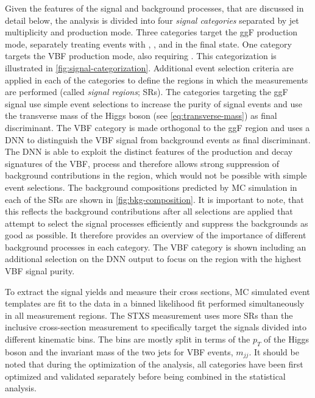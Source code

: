 Given the features of the signal and background processes, that are discussed in detail below, the analysis is divided into four \emph{signal categories} separated by jet multiplicity and production mode.
Three categories target the ggF production mode, separately treating events with \ZeroJet, \OneJet, and \TwoJet in the final state. One category targets the VBF production mode, also requiring \TwoJet. 
This categorization is illustrated in \cref{fig:signal-categorization}.
Additional event selection criteria are applied in each of the categories to define the regions in which the measurements are performed (called \emph{signal regions}; SRs).
The categories targeting the ggF signal use simple event selections to increase the purity of signal events and use the transverse mass of the Higgs boson (see \cref{eq:transverse-mass}) as final discriminant.
The VBF \TwoJet category is made orthogonal to the ggF \TwoJet region and uses a DNN to distinguish the VBF signal from background events as final discriminant.
The DNN is able to exploit the distinct features of the production and decay signatures of the VBF, \HWW process and therefore allows strong suppression of background contributions in the \TwoJet region, which would not be possible with simple event selections. 
The background compositions predicted by MC simulation in each of the SRs are shown in \cref{fig:bkg-composition}.
It is important to note, that this reflects the background contributions after all selections are applied that attempt to select the signal processes efficiently and suppress the backgrounds as good as possible. It therefore provides an overview of the importance of different background processes in each category.
The VBF \TwoJet category is shown including an additional selection on the DNN output to focus on the region with the highest VBF signal purity.

To extract the signal yields and measure their cross sections, MC simulated event templates are fit to the data in a binned likelihood fit performed simultaneously in all measurement regions.
The STXS measurement uses more SRs than the inclusive cross-section measurement to specifically target the signals divided into different kinematic bins. The bins are mostly split in terms of the $p_T$ of the Higgs boson and the invariant mass of the two jets for VBF events, $m_{jj}$. 
It should be noted that during the optimization of the analysis, all categories have been first optimized and validated separately before being combined in the statistical analysis.

